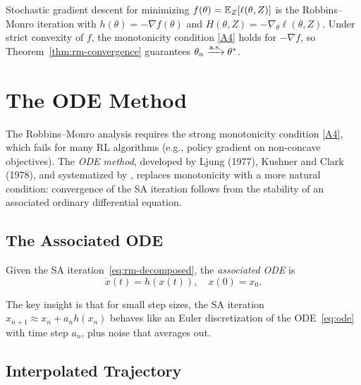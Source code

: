 \documentclass[11pt,a4paper]{article}
\begin{document}
\begin{rlconnection}[title={SGD as Robbins--Monro}]
Stochastic gradient descent for minimizing
$f(\theta) = \mathbb{E}_Z[\ell(\theta, Z)]$ is the Robbins--Monro iteration
with $h(\theta) = -\nabla f(\theta)$ and
$H(\theta, Z) = -\nabla_\theta \ell(\theta, Z)$. Under strict
convexity of $f$, the monotonicity condition \ref{A4} holds for
$-\nabla f$, so Theorem~\ref{thm:rm-convergence} guarantees
$\theta_n \xrightarrow{\text{a.s.}} \theta^*$.
\end{rlconnection}


\section{The ODE Method}
\label{sec:ode-method}

The Robbins--Monro analysis requires the strong monotonicity condition
\ref{A4}, which fails for many RL algorithms (e.g., policy gradient
on non-concave objectives). The \emph{ODE method}, developed by Ljung
(1977), Kushner and Clark (1978), and systematized by
\citet{borkar2008}, replaces monotonicity with a more natural
condition: convergence of the SA iteration follows from the stability
of an associated ordinary differential equation.

\subsection{The Associated ODE}

\begin{definition}
\label{def:associated-ode}
Given the SA iteration~\eqref{eq:rm-decomposed}, the \emph{associated
ODE} is
\begin{equation}
\label{eq:ode}
  \dot{x}(t) = h(x(t)), \quad x(0) = x_0.
\end{equation}
\end{definition}

The key insight is that for small step sizes, the SA iteration
$x_{n+1} \approx x_n + a_n h(x_n)$ behaves like an Euler
discretization of the ODE~\eqref{eq:ode} with time step $a_n$,
plus noise that averages out.

\subsection{Interpolated Trajectory}
\end{document}
